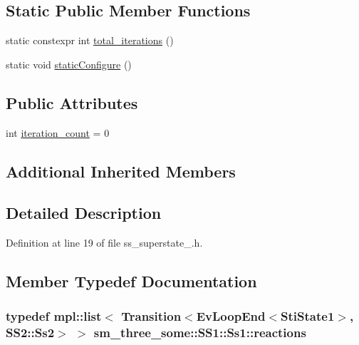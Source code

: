 \subsection*{Static Public Member Functions}
\begin{DoxyCompactItemize}
\item 
static constexpr int \hyperlink{structsm__three__some_1_1SS1_1_1Ss1_a02f44c29d4ebf2615b66a0783ee668e4}{total\+\_\+iterations} ()
\item 
static void \hyperlink{structsm__three__some_1_1SS1_1_1Ss1_a2697925f1d03b131fb253bf12d7bca08}{static\+Configure} ()
\end{DoxyCompactItemize}
\subsection*{Public Attributes}
\begin{DoxyCompactItemize}
\item 
int \hyperlink{structsm__three__some_1_1SS1_1_1Ss1_a775d2050e53513d711b041238b5c11ff}{iteration\+\_\+count} = 0
\end{DoxyCompactItemize}
\subsection*{Additional Inherited Members}


\subsection{Detailed Description}


Definition at line 19 of file ss\+\_\+superstate\+\_.\+h.



\subsection{Member Typedef Documentation}
\subsubsection[{\texorpdfstring{reactions}{reactions}}]{\setlength{\rightskip}{0pt plus 5cm}typedef mpl\+::list$<$ Transition$<$Ev\+Loop\+End$<${\bf Sti\+State1}$>$, {\bf S\+S2\+::\+Ss2}$>$ $>$ {\bf sm\+\_\+three\+\_\+some\+::\+S\+S1\+::\+Ss1\+::reactions}}\hypertarget{structsm__three__some_1_1SS1_1_1Ss1_af609dca860303e5a4b4913bed8b71bed}{}\label{structsm__three__some_1_1SS1_1_1Ss1_af609dca860303e5a4b4913bed8b71bed}


